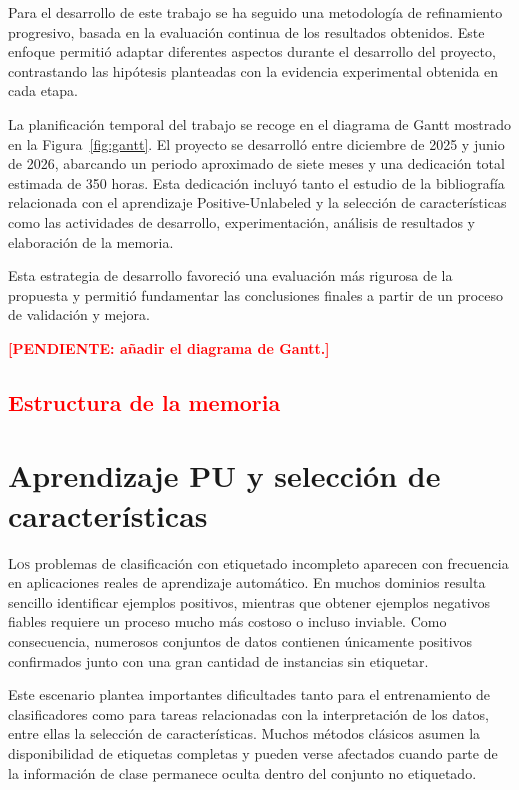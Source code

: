 Para el desarrollo de este trabajo se ha seguido una metodología de refinamiento progresivo, basada en la evaluación continua de los resultados obtenidos. Este enfoque permitió adaptar diferentes aspectos durante el desarrollo del proyecto, contrastando las hipótesis planteadas con la evidencia experimental obtenida en cada etapa.

La planificación temporal del trabajo se recoge en el diagrama de Gantt mostrado en la Figura~\ref{fig:gantt}. El proyecto se desarrolló entre diciembre de 2025 y junio de 2026, abarcando un periodo aproximado de siete meses y una dedicación total estimada de 350 horas. Esta dedicación incluyó tanto el estudio de la bibliografía relacionada con el aprendizaje Positive-Unlabeled y la selección de características como las actividades de desarrollo, experimentación, análisis de resultados y elaboración de la memoria.

Esta estrategia de desarrollo favoreció una evaluación más rigurosa de la propuesta y permitió fundamentar las conclusiones finales a partir de un proceso de validación y mejora.


\textcolor{red}{\textbf{[PENDIENTE: añadir el diagrama de Gantt.]}}
\section{\textcolor{red}{Estructura de la memoria}}
\label{sec:estructura_memoria}

\chapter[Aprendizaje PU]{Aprendizaje PU y selección de características}
\label{chap:marco_teorico}

\lettrine{L}{os} problemas de clasificación con etiquetado incompleto aparecen con frecuencia en aplicaciones reales de aprendizaje automático. En muchos dominios resulta sencillo identificar ejemplos positivos, mientras que obtener ejemplos negativos fiables requiere un proceso mucho más costoso o incluso inviable. Como consecuencia, numerosos conjuntos de datos contienen únicamente positivos confirmados junto con una gran cantidad de instancias sin etiquetar.

Este escenario plantea importantes dificultades tanto para el entrenamiento de clasificadores como para tareas relacionadas con la interpretación de los datos, entre ellas la selección de características. Muchos métodos clásicos asumen la disponibilidad de etiquetas completas y pueden verse afectados cuando parte de la información de clase permanece oculta dentro del conjunto no etiquetado.

